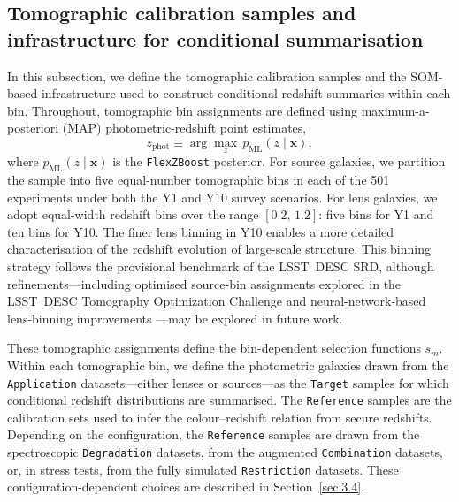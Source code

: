 \subsection{Tomographic calibration samples and infrastructure for conditional summarisation} \label{sec:3.3}

In this subsection, we define the tomographic calibration samples and the SOM-based infrastructure used to construct conditional redshift summaries within each bin. Throughout, tomographic bin assignments are defined using maximum-a-posteriori (MAP) photometric-redshift point estimates,
\begin{equation} \label{eq:20}
    z_{\text{phot}} \equiv \arg\max_{z}\, p_{\mathrm{ML}}(z \mid \mathbf{x}),
\end{equation}
where \(p_{\mathrm{ML}}(z \mid \mathbf{x})\) is the \texttt{FlexZBoost} posterior. For source galaxies, we partition the sample into five equal-number tomographic bins in each of the 501 experiments under both the Y1 and Y10 survey scenarios. For lens galaxies, we adopt equal-width redshift bins over the range \([0.2,\,1.2]\): five bins for Y1 and ten bins for Y10. The finer lens binning in Y10 enables a more detailed characterisation of the redshift evolution of large-scale structure. This binning strategy follows the provisional benchmark of the LSST~DESC SRD, although refinements---including optimised source-bin assignments explored in the LSST~DESC Tomography Optimization Challenge \citep{2021OJAp....4E..13Z} and neural-network-based lens-binning improvements \citep{2023ApJ...950...49M}---may be explored in future work.

These tomographic assignments define the bin-dependent selection functions \(s_m\). Within each tomographic bin, we define the photometric galaxies drawn from the \texttt{Application} datasets---either lenses or sources---as the \texttt{Target} samples for which conditional redshift distributions are summarised. The \texttt{Reference} samples are the calibration sets used to infer the colour--redshift relation from secure redshifts. Depending on the configuration, the \texttt{Reference} samples are drawn from the spectroscopic \texttt{Degradation} datasets, from the augmented \texttt{Combination} datasets, or, in stress tests, from the fully simulated \texttt{Restriction} datasets. These configuration-dependent choices are described in Section~\ref{sec:3.4}.

